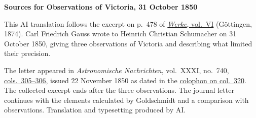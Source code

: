\clearpage\thispagestyle{empty}
\begin{center}\textbf{Sources for Observations of Victoria, 31 October 1850}\end{center}
\noindent This AI translation follows the excerpt on p.~478 of \href{https://gdz.sub.uni-goettingen.de/id/PPN236007467}{\textit{Werke}, vol.~VI} (Göttingen, 1874). Carl Friedrich Gauss wrote to Heinrich Christian Schumacher on 31 October 1850, giving three observations of Victoria and describing what limited their precision.
\par\smallskip\noindent The letter appeared in \textit{Astronomische Nachrichten}, vol.~XXXI, no.~740, \href{https://api.digitale-sammlungen.de/iiif/image/v2/bsb10049456_00157/full/1800,/0/default.jpg}{cols.~305--306}, issued 22 November 1850 as dated in the \href{https://api.digitale-sammlungen.de/iiif/image/v2/bsb10049456_00164/full/1800,/0/default.jpg}{colophon on col.~320}. The collected excerpt ends after the three observations. The journal letter continues with the elements calculated by Goldschmidt and a comparison with observations. Translation and typesetting produced by AI.
\clearpage
